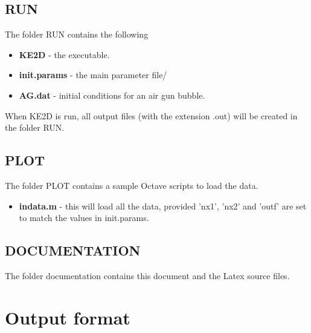 \documentclass{article}
\begin{document}
\subsection{RUN}
The folder RUN contains the following
\begin{itemize}
\item \textbf{KE2D} - the executable.
\item \textbf{init.params} - the main parameter file/
\item \textbf{AG.dat} - initial conditions for an air gun bubble.
\end{itemize}
When KE2D is run, all output files (with the extension .out) will be created in the folder RUN.

\subsection{PLOT}
The folder PLOT contains a sample Octave scripts to load the data.
\begin{itemize}
\item \textbf{indata.m} - this will load all the data, provided 'nx1', 'nx2' and 'outf' are set to match the values in init.params.
\end{itemize}

\subsection{DOCUMENTATION}
The folder documentation contains this document and the Latex source files.

\section{Output format}
\end{document}
